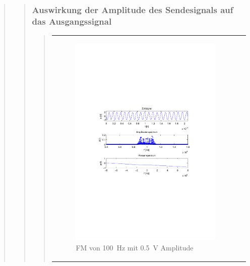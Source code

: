 \begin{quote}
\begin{quote}
\begin{quote}
            
        \end{quote}
        
        \subsubsection{Auswirkung der Amplitude des Sendesignals auf das Ausgangssignal}
        \begin{quote}
            
            \begin{center}
            \begin{tabular}{ll}
            
            \hspace{-5cm}
                \begin{minipage}{0.6\textwidth}
                    \begin{figure}[H]
                        \label{fig:f100_05}
                        \includegraphics[scale=0.7, trim = 35mm 100mm 35mm 95mm, clip]{Bilder/f100_05}
                        \caption{FM von \SI{100}{\hertz} mit \SI{0,5}{\volt} Amplitude}
                    \end{figure}
                \end{minipage}
                

\end{tabular}
\end{center}
\end{quote}
\end{quote}
\end{quote}
